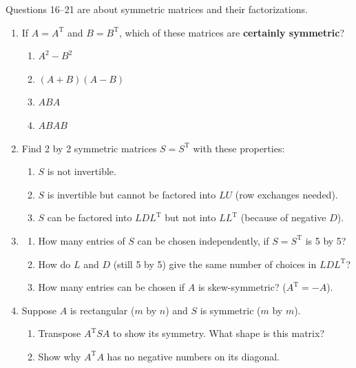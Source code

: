 \documentclass[14pt, a4paper]{article}
\begin{document}
\noindent Questions 16--21 are about symmetric matrices and their factorizations.
\begin{enumerate}[resume]
    \item If $A = A^{\mathrm{T}}$ and $B = B^{\mathrm{T}}$, which of these matrices are \textbf{certainly symmetric}?
          \begin{enumerate}
              \item $A^2 - B^2$
              \item $(A + B)(A - B)$
              \item $ABA$
              \item $ABAB$
          \end{enumerate}

    \item Find 2 by 2 symmetric matrices $S = S^{\mathrm{T}}$ with these properties:
          \begin{enumerate}
              \item $S$ is not invertible.
              \item $S$ is invertible but cannot be factored into $LU$ (row exchanges needed).
              \item $S$ can be factored into $LDL^{\mathrm{T}}$ but not into $LL^{\mathrm{T}}$ (because of negative $D$).
          \end{enumerate}

    \item
          \begin{enumerate}
              \item How many entries of $S$ can be chosen independently, if $S = S^{\mathrm{T}}$ is 5 by 5?
              \item How do $L$ and $D$ (still 5 by 5) give the same number of choices in $LDL^{\mathrm{T}}$?
              \item How many entries can be chosen if $A$ is skew-symmetric? ($A^{\mathrm{T}} = -A$).
          \end{enumerate}

    \item Suppose $A$ is rectangular ($m$ by $n$) and $S$ is symmetric ($m$ by $m$).
          \begin{enumerate}
              \item Transpose $A^{\mathrm{T}}SA$ to show its symmetry. What shape is this matrix?
              \item Show why $A^{\mathrm{T}}A$ has no negative numbers on its diagonal.
          \end{enumerate}


\end{enumerate}
\end{document}
